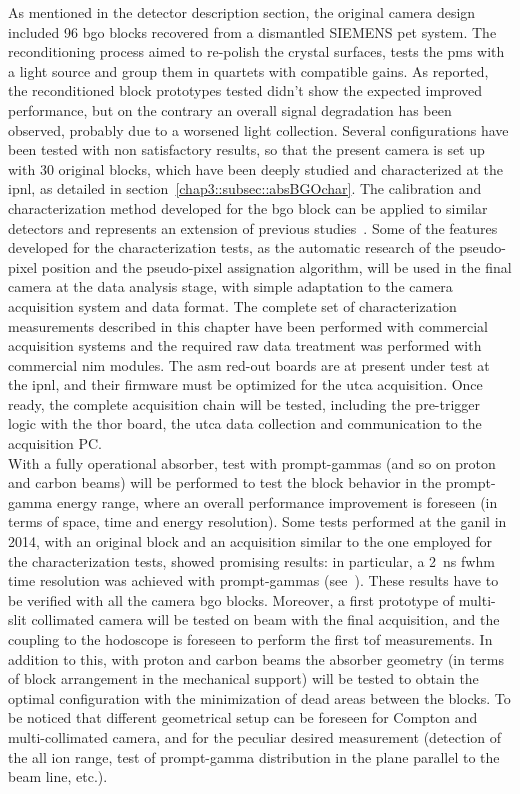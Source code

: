 As mentioned in the detector description section, the original camera design included 96 \gls{bgo} blocks recovered from a dismantled SIEMENS \gls{pet} system. The reconditioning process aimed to re-polish the crystal surfaces, tests the \glspl{pm} with a light source and group them in quartets with compatible gains. As reported, the reconditioned block prototypes tested didn't show the expected improved performance, but on the contrary an overall signal degradation has been observed, probably due to a worsened light collection. Several configurations have been tested with non satisfactory results, so that the present camera is set up with 30 original blocks, which have been deeply studied and characterized at the \gls{ipnl}, as detailed in section~\ref{chap3::subsec::absBGOchar}. The calibration and characterization method developed for the \gls{bgo} block can be applied to similar detectors and represents an extension of previous studies~\parencite{Rogers1994, Tornai1994, Golnik2015, HuesoGonzalez2015}. Some of the features developed for the characterization tests, as the automatic research of the pseudo-pixel position and the pseudo-pixel assignation algorithm, will be used in the final camera at the data analysis stage, with simple adaptation to the camera acquisition system and data format. The complete set of characterization measurements described in this chapter have been performed with commercial acquisition systems and the required raw data treatment was performed with commercial \gls{nim} modules. The \gls{asm} red-out boards are at present under test at the \gls{ipnl}, and their firmware must be optimized for the \gls{utca} acquisition. Once ready, the complete acquisition chain will be tested, including the pre-trigger logic with the \gls{thor} board, the \gls{utca} data collection and communication to the acquisition PC.\\ With a fully operational absorber, test with prompt-gammas (and so on proton and carbon beams) will be performed to test the block behavior in the prompt-gamma energy range, where an overall performance improvement is foreseen (in terms of space, time and energy resolution). Some tests performed at the \gls{ganil} in 2014, with an original block and an acquisition similar to the one employed for the characterization tests, showed promising results: in particular, a 2~ns \gls{fwhm} time resolution was achieved with prompt-gammas (see~\cite{Ley2015}). These results have to be verified with all the camera \gls{bgo} blocks. Moreover, a first prototype of multi-slit collimated camera will be tested on beam with the final acquisition, and the coupling to the hodoscope is foreseen to perform the first \gls{tof} measurements. In addition to this, with proton and carbon beams the absorber geometry (in terms of block arrangement in the mechanical support) will be tested to obtain the optimal configuration with the minimization of dead areas between the blocks. To be noticed that different geometrical setup can be foreseen for Compton and multi-collimated camera, and for the peculiar desired measurement (detection of the all ion range, test of prompt-gamma distribution in the plane parallel to the beam line, etc.).\\
